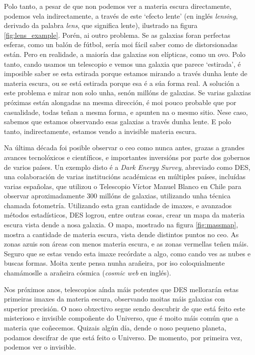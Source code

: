 \documentclass{article}
\begin{document}
Polo tanto, a pesar de que non podemos ver a materia escura directamente, podemos vela indirectamente, 
a través de este `efecto lente' (en inglés {\it lensing}, derivado da palabra {\it lens}, que significa 
lente), ilustrado na figura \ref{fig:lens_example}. Porén, ai outro problema. Se as galaxias foran 
perfectas esferas, como un balón de fútbol, sería moi fácil saber como de distorsionadas están. Pero en 
realidade, a maioría das galaxias son elípticas, como un ovo. Polo tanto, cando usamos un telescopio e 
vemos una galaxia que parece `estirada', é imposible saber se esta estirada porque estamos mirando a través 
dunha lente de materia escura, ou se está estirada porque esa é a súa forma real. A solución a este problema 
e mirar non solo unha, senón millóns de galaxias. Se varias galaxias próximas están alongadas na mesma 
dirección, é moi pouco probable que por casualidade, todas teñan a mesma forma, e apunten na o mesmo sitio.
Nese caso, sabemos que estamos observando esas galaxias a través dunha lente. E polo tanto, indirectamente, 
estamos vendo a invisible materia escura.

Na última década foi posible observar o ceo como nunca antes, grazas a grandes avances tecnolóxicos e 
científicos, e importantes inversións por parte dos gobernos de varios países. Un exemplo disto é a {\it Dark 
Energy Survey}, abreviado como DES, una colaboración de varias institucións académicas en múltiples países, incluídas
varias españolas, que utilizou o Telescopio Víctor Manuel Blanco en Chile para observar aproximadamente 300 millóns de galaxias, utilizando 
unha técnica chamada fotometría. Utilizando esta gran cantidade de imaxes, e avanzados métodos estadísticos, DES 
logrou, entre outras cosas, crear un mapa da materia escura vista dende a nosa galaxia. O mapa, mostrado na figura
 \ref{fig:massmap}, mostra a cantidade de materia escura, vista dende distintos puntos no ceo. As zonas azuis son áreas 
 con menos materia escura, e as zonas vermellas teñen máis. Seguro que se estas vendo esta imaxe recórdate a algo, 
 como cando ves as nubes e buscas formas. Moita xente pensa nunha arañeira, por iso coloquialmente chamámoslle a 
 arañeira cósmica ({\it cosmic web} en inglés). 

Nos próximos anos, telescopios aínda máis potentes que DES mellorarán estas primeiras imaxes da materia escura, 
observando moitas máis galaxias con superior precisión. O noso obxectivo segue sendo descubrir de que está feito 
este misterioso e invisible compoñente do Universo, que é moito máis común que a materia que coñecemos. Quizais 
algún día, dende o noso pequeno planeta, podamos descifrar de que está feito o Universo. De momento, por primeira 
vez, podemos ver o invisible. 
\end{document}
